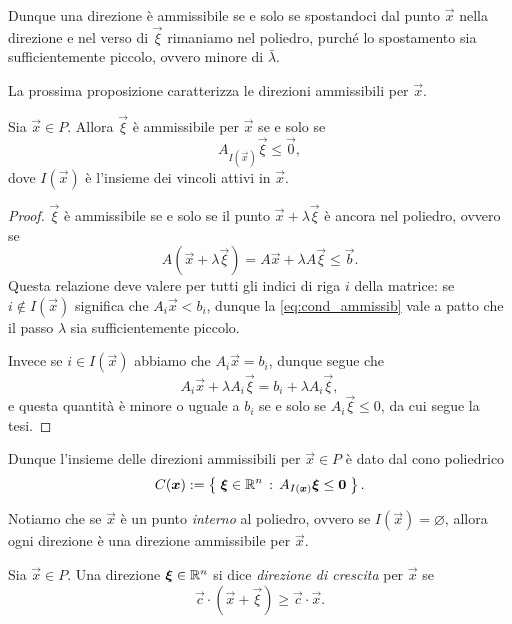 Dunque una direzione è ammissibile se e solo se spostandoci dal punto $\vec x$ nella direzione e nel verso di $\vec \xi$ rimaniamo nel poliedro, purché lo spostamento sia sufficientemente piccolo, ovvero minore di $\bar \lambda$.

La prossima proposizione caratterizza le direzioni ammissibili per $\vec x$.

\begin{proposition}
    Sia $\vec x \in P$. Allora $\vec \xi$ è ammissibile per $\vec x$ se e solo se \[
        A_{I(\vec x)}\vec \xi \leq \vec 0,
    \] dove $I(\vec x)$ è l'insieme dei vincoli attivi in $\vec x$.
\end{proposition}
\begin{proof}
    $\vec \xi$ è ammissibile se e solo se il punto $\vec x + \lambda\vec \xi$ è ancora nel poliedro, ovvero se \begin{equation}\label{eq:cond_ammissib}
        A(\vec x + \lambda\vec \xi) = A\vec x + \lambda A\vec \xi \leq \vec b.
    \end{equation} Questa relazione deve valere per tutti gli indici di riga $i$ della matrice: se $i \notin I(\vec x)$ significa che $A_i\vec x < b_i$, dunque la \eqref{eq:cond_ammissib} vale a patto che il passo $\lambda$ sia sufficientemente piccolo.

    Invece se $i \in I(\vec x)$ abbiamo che $A_i\vec x = b_i$, dunque segue che \[
        A_i\vec x + \lambda A_i\vec \xi = b_i + \lambda A_i\vec \xi,
    \] e questa quantità è minore o uguale a $b_i$ se e solo se $A_i\vec \xi \leq 0$, da cui segue la tesi.
\end{proof}

Dunque l'insieme delle direzioni ammissibili per $\vec x \in P$ è dato dal cono poliedrico \[
    C(\bm{x}) := \left\{\;\bm{\xi} \in \mathbb{R}^n \,:\, A_{I(\bm{x})}\bm{\xi} \leq \bm{0}\;\right\}.    
\]

\begin{remark}
    Notiamo che se $\vec x$ è un punto \emph{interno} al poliedro, ovvero se $I(\vec x) = \varnothing$, allora ogni direzione è una direzione ammissibile per $\vec x$.
\end{remark}

\begin{definition}
    Sia $\vec x \in P$. Una direzione $\bm{\xi} \in \mathbb{R}^n$ si dice \emph{direzione di crescita} per $\vec x$ se \begin{equation}\label{eq:def_crescita}
        \vec c \cdot (\vec x + \vec \xi) \geq \vec c \cdot \vec x.
    \end{equation}
\end{definition}

